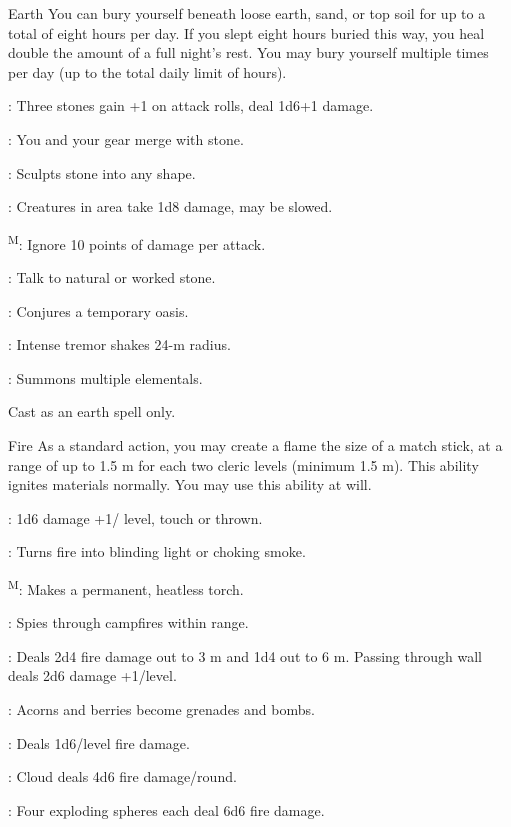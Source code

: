 {Earth}
{You can bury yourself beneath loose earth, sand, or top soil for up to a total of eight hours per day. If you slept eight hours buried this way, you heal double the amount of a full night's rest. You may bury yourself multiple times per day (up to the total daily limit of hours).}
{
	\item {}: Three stones gain +1 on attack rolls, deal 1d6+1 damage.
	\item {}: You and your gear merge with stone.
	\item {}: Sculpts stone into any shape.
	\item {}: Creatures in area take 1d8 damage, may be slowed.
	\item {}\textsuperscript{M}: Ignore 10 points of damage per attack.
	\item {}: Talk to natural or worked stone.
	\item {}: Conjures a temporary oasis.
	\item {}: Intense tremor shakes 24-m radius.
	\item {}\footnotemark[1]: Summons multiple elementals.
}
 Cast as an earth spell only.

{Fire}
{As a standard action, you may create a flame the size of a match stick, at a range of up to 1.5 m for each two cleric levels (minimum 1.5 m). This ability ignites materials normally. You may use this ability at will.}
{
	\item {}: 1d6 damage +1/ level, touch or thrown.
	\item {}: Turns fire into blinding light or choking smoke.
	\item {}\textsuperscript{M}: Makes a permanent, heatless torch.
	\item {}: Spies through campfires within range.
	\item {}: Deals 2d4 fire damage out to 3 m and 1d4 out to 6 m. Passing through wall deals 2d6 damage +1/level.
	\item {}: Acorns and berries become grenades and bombs.
	\item {}: Deals 1d6/level fire damage.
	\item {}: Cloud deals 4d6 fire damage/round.
	\item {}: Four exploding spheres each deal 6d6 fire damage.
}

